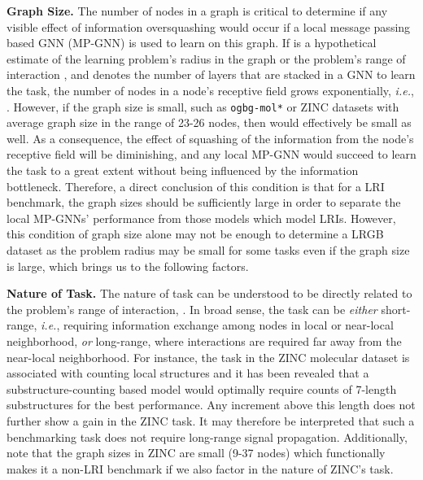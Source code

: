 \documentclass{article}
\begin{document}
\textbf{Graph Size.} The number of nodes in a graph is critical to determine if any visible effect of information oversquashing would occur if a local message passing based GNN (MP-GNN) is used to learn on this graph. If  is a hypothetical estimate of the learning problem's radius in the graph or the problem's range of interaction \cite{alon2020bottleneck}, and  denotes the number of layers that are stacked in a GNN to learn the task, the number of nodes in a node's receptive field grows exponentially, \textit{i.e.},  \cite{alon2020bottleneck, chen2017stochastic}. However, if the graph size is small, such as \texttt{ogbg-mol*} \cite{hu2020open} or ZINC \cite{dwivedi2020benchmarking} datasets with average graph size in the range of 23-26 nodes, then  would effectively be small as well. As a consequence, the effect of squashing of the information from the node's receptive field will be diminishing, and any local MP-GNN would succeed to learn the task to a great extent without being influenced by the information bottleneck. Therefore, a direct conclusion of this condition is that for a LRI benchmark, the graph sizes should be sufficiently large in order to separate the local MP-GNNs' performance from those models which model LRIs. However, this condition of graph size alone may not be enough to determine a LRGB dataset as the problem radius  may be small for some tasks even if the graph size is large, which brings us to the following factors.


\textbf{Nature of Task.}
The nature of task can be understood to be directly related to the problem's range of interaction, . In broad sense, the task can be \textit{either} short-range, \textit{i.e.}, requiring information exchange among nodes in local or near-local neighborhood, \textit{or} long-range, where interactions are required far away from the near-local neighborhood. For  instance, the task in the ZINC molecular dataset \cite{irwin2012zinc, dwivedi2020benchmarking} is associated with counting local structures and it has been revealed that a substructure-counting based model \cite{bouritsas2022improving} would optimally require counts of 7-length substructures for the best performance. Any increment above this length does not further show a gain in the ZINC task. It may therefore be interpreted that such a benchmarking task does not require long-range signal propagation. Additionally, note that the graph sizes in ZINC are small (9-37 nodes) which functionally makes it a non-LRI benchmark if we also factor in the nature of ZINC's task. 
\end{document}
